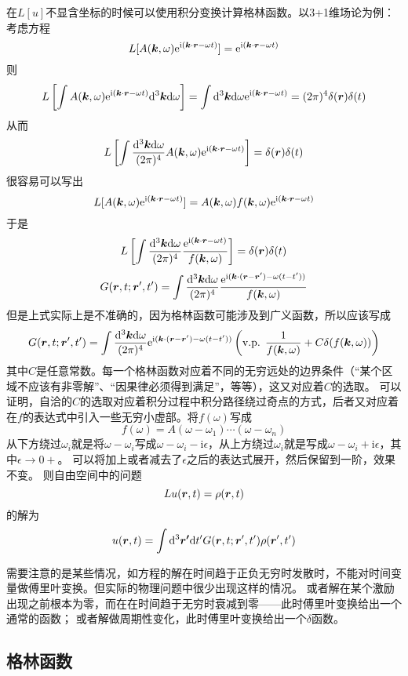 \documentclass[UTF8]{ctexart}
\newcommand*{\ii}{\mathrm{i}}
\newcommand*{\ee}{\mathrm{e}}
\begin{document}
在$L[u]$不显含坐标的时候可以使用积分变换计算格林函数。以3+1维场论为例：考虑方程
\[
    L[A(\vb*{k}, \omega) \ee^{\ii (\vb*{k} \cdot \vb*{r} - \omega t)}] = \ee^{\ii (\vb*{k} \cdot \vb*{r} - \omega t)}
\]
则
\[
    L\left[\int A(\vb*{k}, \omega) \ee^{\ii (\vb*{k} \cdot \vb*{r} - \omega t)} \dd^3 \vb*{k} \dd \omega \right] = \int \dd^3 \vb*{k} \dd \omega \ee^{\ii (\vb*{k} \cdot \vb*{r} - \omega t)} = (2\pi)^4 \delta(\vb*{r}) \delta(t)
\]
从而
\[
    L\left[\int \frac{\dd^3 \vb*{k} \dd \omega }{(2\pi)^4} A(\vb*{k}, \omega) \ee^{\ii (\vb*{k} \cdot \vb*{r} - \omega t)} \right] = \delta(\vb*{r}) \delta(t)
\]
很容易可以写出
\[
    L[A(\vb*{k}, \omega) \ee^{\ii (\vb*{k} \cdot \vb*{r} - \omega t)}] = A(\vb*{k}, \omega) f(\vb*{k}, \omega) \ee^{\ii (\vb*{k} \cdot \vb*{r} - \omega t)}
\]
于是
\[
    L\left[\int \frac{\dd^3 \vb*{k} \dd \omega }{(2\pi)^4} \frac{\ee^{\ii (\vb*{k} \cdot \vb*{r} - \omega t)}}{f(\vb*{k}, \omega)} \right] = \delta(\vb*{r}) \delta(t)
\]
\[
    G(\vb*{r}, t; \vb*{r}', t') = \int \frac{\dd^3 \vb*{k} \dd \omega}{(2\pi)^4} \frac{\ee^{\ii (\vb*{k} \cdot (\vb*{r} - \vb*{r}') - \omega (t - t'))}}{f(\vb*{k}, \omega)} 
\]
但是上式实际上是不准确的，因为格林函数可能涉及到广义函数，所以应该写成
\[
    G(\vb*{r}, t; \vb*{r}', t') = \int \frac{\dd^3 \vb*{k} \dd \omega}{(2\pi)^4} \ee^{\ii (\vb*{k} \cdot (\vb*{r} - \vb*{r}') - \omega (t - t'))}  \left(\text{v.p. } \frac{1}{f(\vb*{k}, \omega)} + C \delta (f(\vb*{k}, \omega))\right)
\]
其中$C$是任意常数。每一个格林函数对应着不同的无穷远处的边界条件（“某个区域不应该有非零解”、“因果律必须得到满足”，等等），这又对应着$C$的选取。
可以证明，自洽的$C$的选取对应着积分过程中积分路径绕过奇点的方式，后者又对应着在$f$的表达式中引入一些无穷小虚部。将$f(\omega)$写成
\[
    f(\omega) = A (\omega - \omega_1) \cdots (\omega - \omega_n)
\]
从下方绕过$\omega_i$就是将$\omega - \omega_i$写成$\omega - \omega_i - \ii \epsilon$，从上方绕过$\omega_i$就是写成$\omega - \omega_i + \ii \epsilon$，其中$\epsilon \to 0+$。
可以将加上或者减去了$\epsilon$之后的表达式展开，然后保留到一阶，效果不变。
则自由空间中的问题
\[
    L u (\vb*{r}, t) = \rho(\vb*{r}, t)
\]
的解为
\[
    u(\vb*{r}, t) = \int \dd^3 \vb*{r'} \dd t' G(\vb*{r}, t; \vb*{r}', t') \rho(\vb*{r}', t')
\]

需要注意的是某些情况，如方程的解在时间趋于正负无穷时发散时，不能对时间变量做傅里叶变换。但实际的物理问题中很少出现这样的情况。
或者解在某个激励出现之前根本为零，而在在时间趋于无穷时衰减到零——此时傅里叶变换给出一个通常的函数；
或者解做周期性变化，此时傅里叶变换给出一个$\delta$函数。

\subsection{格林函数}
\end{document}
